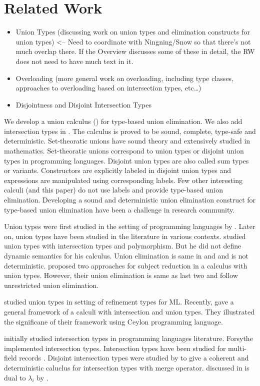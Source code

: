 \section{Related Work}
\label{sec:related}

\begin{itemize}
	\item {Union Types    (discussing work on union types and elimination constructs for union types) <-- Need to coordinate with Ningning/Snow so that there’s not much overlap there. If the Overview discusses some of these in detail, the RW does not need to have much text in it.}
	\item {Overloading (more general work on overloading, including type classes, approaches to overloading based on intersection types, etc…)}
	\item{Disjointness and Disjoint Intersection Types}
\end{itemize}

\noindent We develop a union calculus (\cal) for type-based union elimination. 
We also add intersection types in
\cal. The calculus is proved to be sound, complete, type-safe and deterministic. Set-theoratic unions have
sound theory and extensively studied in mathematics. Set-theoratic unions correspond to union types
or disjoint union types in programming languages. Disjoint union types are also called sum types or variants.
Constructors are explicitly labeled in disjoint union types and expressions are manipulated using
corresponding labels. Few other interesting calculi (and this paper) do not use labels and provide type-based
union elimination. Developing a sound and deterministic union elimination construct
for type-based union elimination have been a challenge in research community.

Union types were first studied in the setting of programming languages by 
\citet{macqueen1984ideal}. Later on, union types have been studied in
the literature in various contexts. \citep{pierce1991programming} studied union types with intersection
types and polymorphism. But he did not define dynamic semantics for his calculus. Union elimination is same
in \citep{macqueen1984ideal} and \citep{pierce1991programming} and is not deterministic.
\citet{barbanera1995intersection} proposed two approaches for subject reduction in a calculus with
union types. However, their union elimination is same as last two and follow unrestricted union
elimination.

\citet{freeman1991refinement} studied union types in setting of refinement types for ML.
 Recently, \citet{muehlboeck2018empowering} gave a general framework of a calculi with intersection and 
union types. They illustrated the significane of their framework using Ceylon programming language.

\cite{} initially studied intersection types in programming languages literature.
Forsythe \cite{} implemented intersection types. Intersection types have been studied for
multi-field records \cite{}. 
Disjoint intersection types were studied by \citet{oliveira2016disjoint} to give a coherent
and deterministic caluclus for intersection types with merge operator. \cal discussed in 
is dual to $\lambda_{i}$ by \citet{oliveira2016disjoint}.